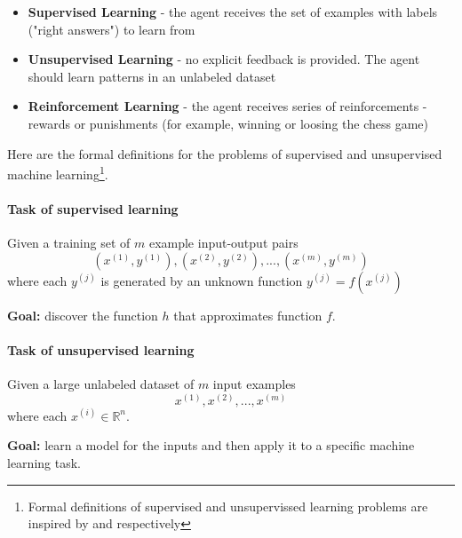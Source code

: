   \begin{itemize}
    \item \textbf{Supervised Learning} - the agent receives the set of examples with labels ("right answers") to learn from
    \item \textbf{Unsupervised Learning} - no explicit feedback is provided. The agent should learn patterns in an unlabeled dataset
    \item \textbf{Reinforcement Learning} - the agent receives series of reinforcements - rewards or punishments (for example, winning or loosing the chess game)
  \end{itemize}
  
  Here are the formal definitions for the problems of supervised and unsupervised machine learning\footnote{Formal definitions of supervised and unsupervissed learning problems are inspired by \cite{Russell-Norvig-2010} and \cite{Raina-et-al-2009} respectively}.
  
  \paragraph{Task of supervised learning}
  Given a training set of $ m $ example input-output pairs
  \[ (x^{(1)}, y^{(1)}), (x^{(2)}, y^{(2)}), ..., (x^{(m)}, y^{(m)}) \]
  where each $ y^{(j)} $ is generated by an unknown function $ y^{(j)} = f(x^{(j)}) $
  
  \textbf{Goal:} discover the function $ h $ that approximates function $ f $.
  
  \paragraph{Task of unsupervised learning}
  Given a large unlabeled dataset of $ m $ input examples
  \[ x^{(1)}, x^{(2)}, ..., x^{(m)} \]
  where each $ x^{(i)} \in \mathbb{R}^{n} $.
  
  \textbf{Goal:} learn a model for the inputs and then apply it to a specific machine learning task.
  
